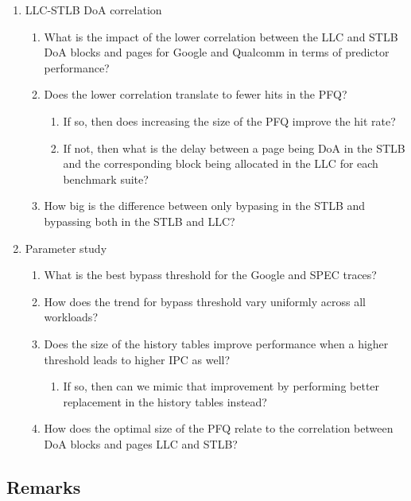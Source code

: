 \documentclass[12pt]{article}
\begin{document}
\begin{enumerate}
  \item LLC-STLB DoA correlation
  \begin{enumerate}
    \item What is the impact of the lower correlation between the LLC and STLB DoA
      blocks and pages for Google and Qualcomm in terms of predictor performance?
    \item Does the lower correlation translate to fewer hits in the PFQ?
      \begin{enumerate}
        \item If so, then does increasing the size of the PFQ improve the hit rate?
        \item If not, then what is the delay between a page being DoA in the STLB and 
          the corresponding block being allocated in the LLC for each benchmark suite?
      \end{enumerate}
    \item How big is the difference between only bypasing in the STLB and bypassing
      both in the STLB and LLC?
  \end{enumerate}
  \item Parameter study
    \begin{enumerate}
      \item What is the best bypass threshold for the Google and SPEC traces?
      \item How does the trend for bypass threshold vary uniformly across all workloads?
      \item Does the size of the history tables improve performance when a higher threshold
        leads to higher IPC as well?
        \begin{enumerate}
          \item If so, then can we mimic that improvement by performing better replacement in
            the history tables instead?
        \end{enumerate}
      \item How does the optimal size of the PFQ relate to the correlation between DoA
        blocks and pages LLC and STLB?
    \end{enumerate}
\end{enumerate}

\subsection{Remarks}
\end{document}
